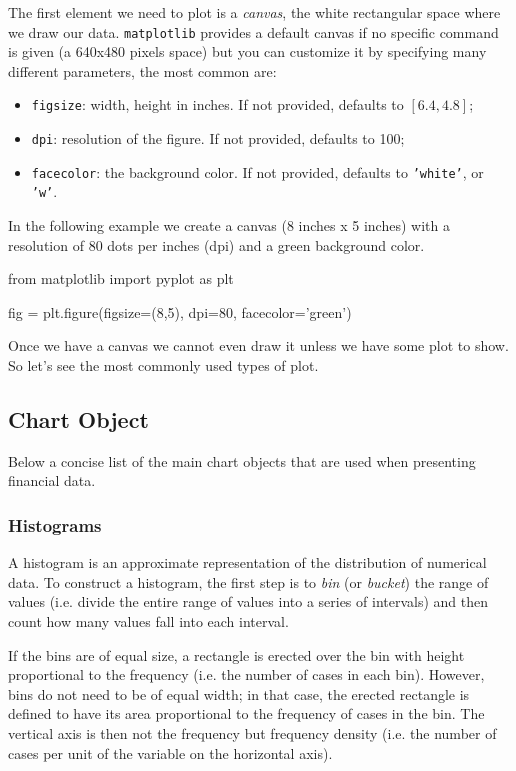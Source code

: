 The first element we need to plot is a \emph{canvas}, the white rectangular space where we draw our data. \texttt{matplotlib} provides a default canvas if no specific command is given (a 640x480 pixels space) but you can customize it by specifying many different parameters, the most common are:

\begin{itemize}
\tightlist
\item \texttt{figsize}: width, height in inches. If not provided, defaults to \([6.4, 4.8]\);
\item \texttt{dpi}: resolution of the figure. If not provided, defaults to 100;
\item \texttt{facecolor}: the background color. If not provided, defaults to \texttt{'white'}, or \texttt{'w'}.
\end{itemize}

In the following example we create a canvas (8 inches x 5 inches) with a resolution of 80 dots per inches (dpi) and a green background color.

\begin{ipythonnon}
from matplotlib import pyplot as plt

fig = plt.figure(figsize=(8,5), dpi=80, facecolor='green')
\end{ipythonnon}

Once we have a canvas we cannot even draw it unless we have some plot to show. So let's see the most commonly used types of plot.

\subsection{Chart Object}\label{chart-object}

Below a concise list of the main chart objects that are used when presenting financial data.

\subsubsection{Histograms}\label{histograms}

A histogram is an approximate representation of the distribution of numerical data. To construct a histogram, the first step is to \emph{bin} (or \emph{bucket}) the range of values (i.e. divide the entire range of values into a series of intervals) and then count how many values fall into each interval.

If the bins are of equal size, a rectangle is erected over the bin with height proportional to the frequency (i.e. the number of cases in each bin).
However, bins do not need to be of equal width; in that case, the erected rectangle is defined to have its area proportional to the frequency of cases in the bin. 
The vertical axis is then not the frequency but frequency density (i.e. the number of cases per unit of the variable on the horizontal axis).

